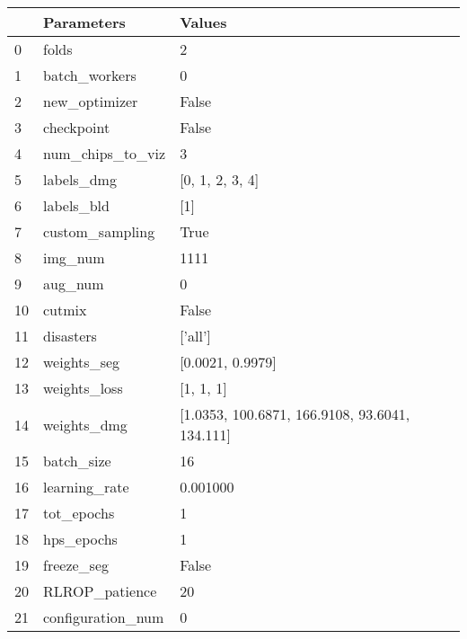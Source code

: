 \begin{tabular}{lll}
\toprule
 & Parameters & Values \\
\midrule
0 & folds & 2 \\
1 & batch_workers & 0 \\
2 & new_optimizer & False \\
3 & checkpoint & False \\
4 & num_chips_to_viz & 3 \\
5 & labels_dmg & [0, 1, 2, 3, 4] \\
6 & labels_bld & [1] \\
7 & custom_sampling & True \\
8 & img_num & 1111 \\
9 & aug_num & 0 \\
10 & cutmix & False \\
11 & disasters & ['all'] \\
12 & weights_seg & [0.0021, 0.9979] \\
13 & weights_loss & [1, 1, 1] \\
14 & weights_dmg & [1.0353, 100.6871, 166.9108, 93.6041, 134.111] \\
15 & batch_size & 16 \\
16 & learning_rate & 0.001000 \\
17 & tot_epochs & 1 \\
18 & hps_epochs & 1 \\
19 & freeze_seg & False \\
20 & RLROP_patience & 20 \\
21 & configuration_num & 0 \\
\bottomrule
\end{tabular}
